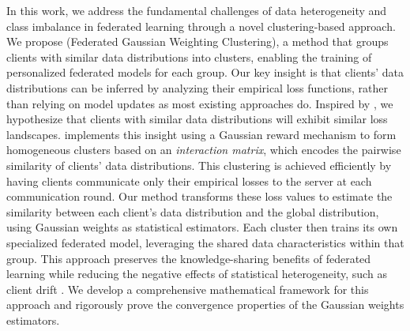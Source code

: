 In this work, we address the fundamental challenges of data heterogeneity and class imbalance in federated learning through a novel clustering-based approach. We propose \shortname (Federated Gaussian Weighting Clustering), a method that groups clients with similar data distributions into clusters, enabling the training of personalized federated models for each group. Our key insight is that clients' data distributions can be inferred by analyzing their empirical loss functions, rather than relying on model updates as most existing approaches do. Inspired by \citep{cho2022towards}, we hypothesize that clients with similar data distributions will exhibit similar loss landscapes.
\shortname implements this insight using a Gaussian reward mechanism to form homogeneous clusters based on an \textit{interaction matrix}, which encodes the pairwise similarity of clients' data distributions. This clustering is achieved efficiently by having clients communicate only their empirical losses to the server at each communication round. Our method transforms these loss values to estimate the similarity between each client's data distribution and the global distribution, using Gaussian weights as statistical estimators.
Each cluster then trains its own specialized federated model, leveraging the shared data characteristics within that group. This approach preserves the knowledge-sharing benefits of federated learning while reducing the negative effects of statistical heterogeneity, such as client drift \citep{karimireddy2020scaffold}. We develop a comprehensive mathematical framework for this approach and rigorously prove the convergence properties of the Gaussian weights estimators.

